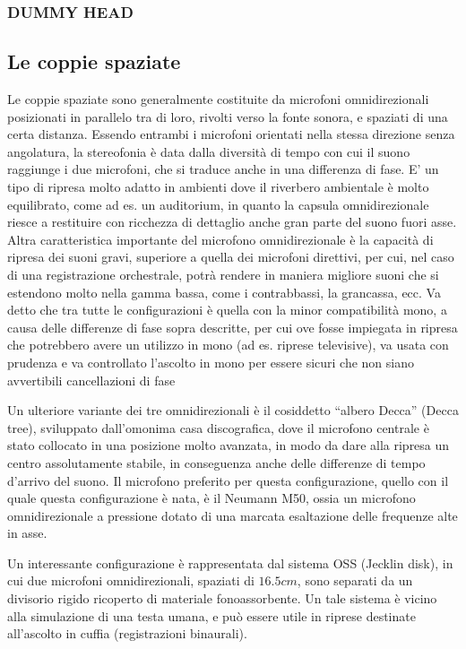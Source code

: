 \subsubsection*{DUMMY HEAD}
\subsection*{Le coppie spaziate}
Le coppie spaziate sono generalmente costituite da microfoni omnidirezionali
posizionati in parallelo tra di loro, rivolti verso la fonte sonora, e spaziati
di una certa distanza. Essendo entrambi i microfoni orientati nella stessa
direzione senza angolatura, la stereofonia è data dalla diversità di tempo
con cui il suono raggiunge i due microfoni, che si traduce anche in una
differenza di fase. E’ un tipo di ripresa molto adatto in ambienti dove il
riverbero ambientale è molto equilibrato, come ad es. un auditorium, in
quanto la capsula omnidirezionale riesce a restituire con ricchezza di dettaglio
anche gran parte del suono fuori asse. Altra caratteristica importante del
microfono omnidirezionale è la capacità di ripresa dei suoni gravi, superiore
a quella dei microfoni direttivi, per cui, nel caso di una registrazione
orchestrale, potrà rendere in maniera migliore suoni che si estendono molto
nella gamma bassa, come i contrabbassi, la grancassa, ecc. Va detto che tra
tutte le configurazioni è quella con la minor compatibilità mono, a causa delle
differenze di fase sopra descritte, per cui ove fosse impiegata in ripresa che
potrebbero avere un utilizzo in mono (ad es. riprese televisive), va usata con
prudenza e va controllato l’ascolto in mono per essere sicuri che non siano
avvertibili cancellazioni di fase

Un ulteriore variante dei tre omnidirezionali è il cosiddetto “albero Decca”
(Decca tree), sviluppato dall’omonima casa discografica, dove il microfono
centrale è stato collocato in una posizione molto avanzata, in modo da dare
alla ripresa un centro assolutamente stabile, in conseguenza anche delle
differenze di tempo d’arrivo del suono. Il microfono preferito per questa
configurazione, quello con il quale questa configurazione è nata, è il
Neumann M50, ossia un microfono omnidirezionale a pressione dotato di una marcata
esaltazione delle frequenze alte in asse.

Un interessante configurazione è rappresentata dal sistema OSS (Jecklin disk),
in cui due microfoni omnidirezionali, spaziati di $16.5cm$, sono separati da un
divisorio rigido ricoperto di materiale fonoassorbente. Un tale sistema è vicino
alla simulazione di una testa umana, e può essere utile in riprese destinate
all’ascolto in cuffia (registrazioni binaurali).

